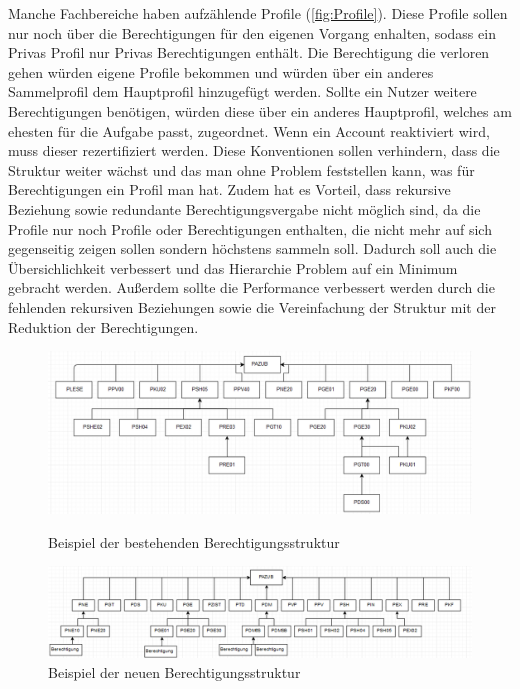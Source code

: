 Manche Fachbereiche haben aufzählende Profile (\ref{fig:Profile}).
Diese Profile sollen nur noch über die Berechtigungen für den eigenen Vorgang enhalten, sodass ein Privas Profil nur Privas Berechtigungen enthält.
Die Berechtigung die verloren gehen würden eigene Profile bekommen und würden über ein anderes Sammelprofil dem Hauptprofil hinzugefügt werden.
Sollte ein Nutzer weitere Berechtigungen benötigen, würden diese über ein anderes Hauptprofil, welches am ehesten für die Aufgabe passt, zugeordnet.
Wenn ein Account reaktiviert wird, muss dieser rezertifiziert werden.
\newline
Diese Konventionen sollen verhindern, dass die Struktur weiter wächst und das man ohne Problem feststellen kann, was für Berechtigungen ein Profil man hat.
Zudem hat es Vorteil, dass rekursive Beziehung sowie redundante Berechtigungsvergabe nicht möglich sind, da die Profile nur noch Profile oder Berechtigungen enthalten, die nicht mehr auf sich gegenseitig zeigen sollen sondern höchstens sammeln soll.
Dadurch soll auch die Übersichlichkeit verbessert und das Hierarchie Problem auf ein Minimum gebracht werden.
Außerdem sollte die Performance verbessert werden durch die fehlenden rekursiven Beziehungen sowie die Vereinfachung der Struktur mit der Reduktion der Berechtigungen.
\begin{figure}[h!]
\hspace*{-2cm}
 \centering
 \includegraphics[width=1.25\textwidth]{gfx/Picture/Vorher.PNG}
 \caption{Beispiel der bestehenden Berechtigungsstruktur}
 \label{fig:AltBer}
\hspace*{-2cm}
 \centering
 \includegraphics[width=1.25\textwidth]{gfx/Picture/Nachher.PNG}
 \caption{Beispiel der neuen Berechtigungsstruktur}
 \label{fig:NeuBer}
\end{figure}
